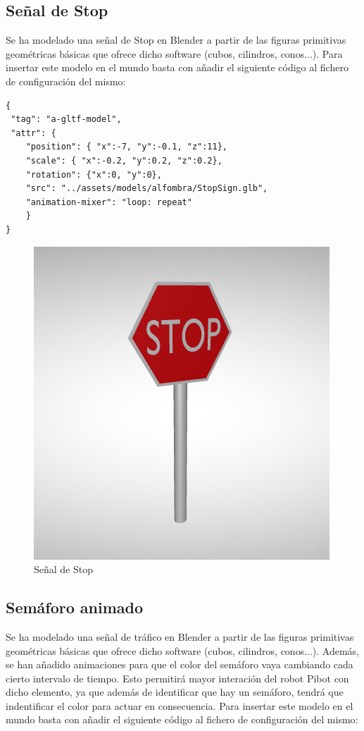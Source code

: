 \documentclass{report}
\begin{document}
\newpage
\subsection{Señal de Stop}
Se ha modelado una señal de Stop en Blender a partir de las figuras primitivas geométricas básicas que ofrece dicho software (cubos, cilindros, conos...). Para insertar este modelo en el mundo basta con añadir el siguiente código al fichero de configuración del mismo:

\begin{lstlisting}[backgroundcolor = \color{light-gray},
				   aboveskip = 2em,
				   belowskip = 2em,
                   xleftmargin = 2cm,
                   framexleftmargin = 1em,
                   basicstyle=\small]
{
 "tag": "a-gltf-model",
 "attr": {
	"position": { "x":-7, "y":-0.1, "z":11},
	"scale": { "x":-0.2, "y":0.2, "z":0.2},
	"rotation": {"x":0, "y":0},
	"src": "../assets/models/alfombra/StopSign.glb",
	"animation-mixer": "loop: repeat"
	}
}
\end{lstlisting}

\renewcommand{\figurename}{Figura}		
\begin{figure}[h]
	\centering
	 \includegraphics[scale=0.35]{images/cap4/stop.png}
	 \caption{Señal de Stop}
\end{figure}



\subsection{Semáforo animado}
Se ha modelado una señal de tráfico en Blender a partir de las figuras primitivas geométricas básicas que ofrece dicho software (cubos, cilindros, conos...). Además, se han añadido animaciones para que el color del semáforo vaya cambiando cada cierto intervalo de tiempo. Esto permitirá mayor interación del robot Pibot con dicho elemento, ya que además de identificar que hay un semáforo, tendrá que indentificar el color para actuar en consecuencia. Para insertar este modelo en el mundo basta con añadir el siguiente código al fichero de configuración del mismo:
\end{document}
